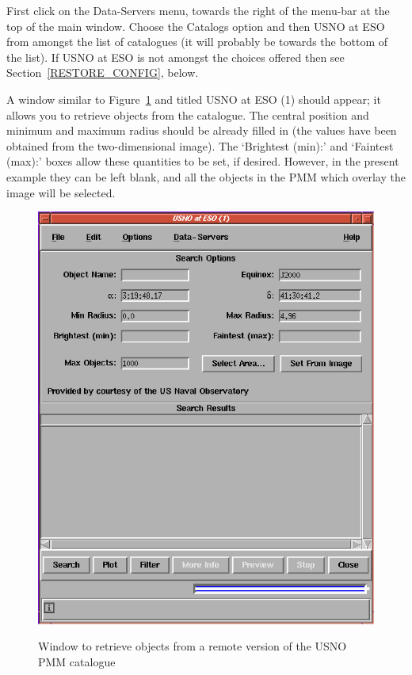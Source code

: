 \documentclass[twoside,11pt]{article}
\renewcommand{\_}{\texttt{\symbol{95}}}
\begin{document}
\begin{enumerate}
   First click on the {\sf Data-Servers} menu, towards the right of the
   menu-bar at the top of the main window.  Choose the {\sf Catalogs}
   option and then {\sf USNO at ESO} from amongst the list of catalogues
   (it will probably be towards the bottom of the list).  If {\sf USNO at
   ESO} is not amongst the choices offered then see
   Section~\ref{RESTORE_CONFIG}, below.

   A window similar to Figure~\ref{RETRIEV_R_PMM} and titled {\sf USNO at
   ESO (1)} should appear; it allows you to retrieve objects from the
   catalogue.  The central position and minimum and maximum radius should
   be already filled in (the values have been obtained from the
   two-dimensional image).  The `{\sf Brightest (min):}' and `{\sf Faintest
   (max):}' boxes allow these quantities to be set, if desired.  However,
   in the present example they can be left blank, and all the objects in
   the PMM which overlay the image will be selected.

  \begin{figure}[htbp]
     \centering
     \includegraphics[totalheight=4in]{sc17_retriev_r_pmm.ps}
     \begin{quote}
     \caption[Window to retrieve a remote catalogue]
      {Window to retrieve objects from a remote version of the USNO
      PMM catalogue
     \label{RETRIEV_R_PMM} }
     \end{quote}
  \end{figure}


\end{enumerate}
\end{document}
